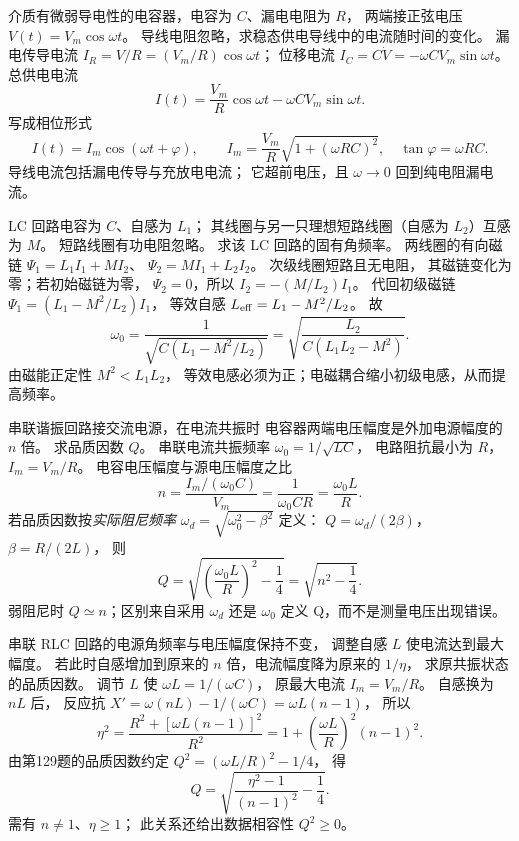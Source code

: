 介质有微弱导电性的电容器，电容为 $C$、漏电电阻为 $R$，
两端接正弦电压
$V(t)=V_m\cos\omega t$。
导线电阻忽略，求稳态供电导线中的电流随时间的变化。
\exsolution
漏电传导电流
$I_R=V/R=(V_m/R)\cos\omega t$；
位移电流
$I_C=C\dot V=-\omega CV_m\sin\omega t$。
总供电电流
\[
I(t)=\frac{V_m}{R}\cos\omega t-\omega CV_m\sin\omega t.
\]
写成相位形式
\[
\boxed{I(t)=I_m\cos(\omega t+\varphi)},\qquad
\boxed{I_m=\frac{V_m}{R}\sqrt{1+(\omega RC)^2}},
\quad
\boxed{\tan\varphi=\omega RC}.
\]
\excheck 导线电流包括漏电传导与充放电电流；
它超前电压，且 $\omega\to0$ 回到纯电阻漏电流。

LC 回路电容为 $C$、自感为 $L_1$；
其线圈与另一只理想短路线圈（自感为 $L_2$）互感为 $M$。
短路线圈有功电阻忽略。
求该 LC 回路的固有角频率。
\exsolution
两线圈的有向磁链
$\Psi_1=L_1I_1+MI_2$、
$\Psi_2=MI_1+L_2I_2$。
次级线圈短路且无电阻，
其磁链变化为零；若初始磁链为零，
$\Psi_2=0$，所以
$I_2=-(M/L_2)I_1$。
代回初级磁链
$\Psi_1=(L_1-M^2/L_2)I_1$，
等效自感
$L_{\rm eff}=L_1-M^2/L_2$。
故
\[
\boxed{\omega_0=
\frac1{\sqrt{C(L_1-M^2/L_2)}}
=\sqrt{\frac{L_2}{C(L_1L_2-M^2)}}}.
\]
\excheck 由磁能正定性 $M^2<L_1L_2$，
等效电感必须为正；电磁耦合缩小初级电感，从而提高频率。

串联谐振回路接交流电源，在电流共振时
电容器两端电压幅度是外加电源幅度的 $n$ 倍。
求品质因数 $Q$。
\exsolution
串联电流共振频率
$\omega_0=1/\sqrt{LC}$，
电路阻抗最小为 $R$，
$I_m=V_m/R$。
电容电压幅度与源电压幅度之比
\[
n=\frac{I_m/(\omega_0 C)}{V_m}
=\frac1{\omega_0CR}
=\frac{\omega_0L}{R}.
\]
若品质因数按\emph{实际阻尼频率}
$\omega_d=\sqrt{\omega_0^2-\beta^2}$ 定义：
$Q=\omega_d/(2\beta)$，
$\beta=R/(2L)$，
则
\[
\boxed{Q=\sqrt{\left(\frac{\omega_0L}{R}\right)^2
-\frac14}
=\sqrt{n^2-\frac14}}.
\]
\excheck 弱阻尼时 $Q\simeq n$；区别来自采用 $\omega_d$ 还是 $\omega_0$ 定义 Q，而不是测量电压出现错误。

串联 RLC 回路的电源角频率与电压幅度保持不变，
调整自感 $L$ 使电流达到最大幅度。
若此时自感增加到原来的 $n$ 倍，电流幅度降为原来的 $1/\eta$，
求原共振状态的品质因数。
\exsolution
调节 $L$ 使
$\omega L=1/(\omega C)$，
原最大电流 $I_m=V_m/R$。
自感换为 $nL$ 后，
反应抗
$X'=\omega(nL)-1/(\omega C)
=\omega L(n-1)$，
所以
\[
\eta^2=
\frac{R^2+[\omega L(n-1)]^2}{R^2}
=1+\left(\frac{\omega L}{R}\right)^2(n-1)^2.
\]
由第129题的品质因数约定
$Q^2=(\omega L/R)^2-1/4$，
得
\[
\boxed{Q=
\sqrt{\frac{\eta^2-1}{(n-1)^2}-\frac14}}.
\]
\excheck 需有 $n\ne1$、$\eta\ge1$；
此关系还给出数据相容性 $Q^2\ge0$。

